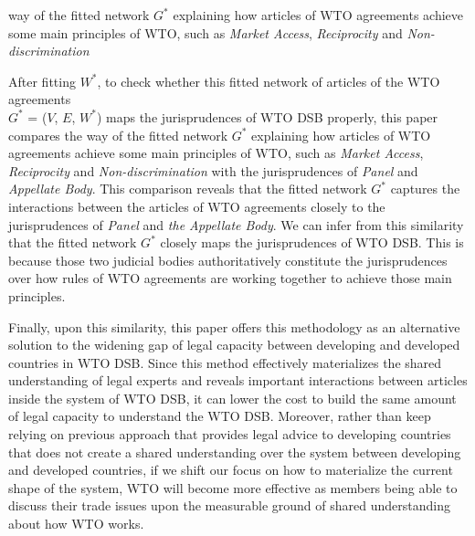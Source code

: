 



way of the fitted network $G^*$ explaining how articles of WTO agreements achieve some main principles of WTO, such as \textit{Market Access}, \textit{Reciprocity} and \textit{Non-discrimination}



 
After fitting $W^*$, to check whether this fitted network of articles of the WTO agreements\\  $G^*$ = ($V$, $E$, $W^*$) maps the jurisprudences of WTO DSB properly, this paper
compares the way of the fitted network $G^*$ explaining how articles of WTO agreements achieve some main principles of WTO, such as \textit{Market Access}, \textit{Reciprocity} and \textit{Non-discrimination}
with the jurisprudences of \textit{Panel} and \textit{Appellate Body}. This comparison reveals that the fitted network $G^*$ captures the interactions between the articles of WTO agreements
closely to the jurisprudences of \textit{Panel} and \textit{the Appellate Body}. We can infer from this similarity that the fitted network $G^*$ closely maps the jurisprudences of WTO DSB. This is because those two judicial bodies
authoritatively constitute the jurisprudences over how rules of WTO agreements are working together
to achieve those main principles.
 
Finally, upon this similarity, this paper offers this methodology as
an alternative solution to the widening gap of legal capacity between developing and developed countries in WTO DSB.
Since this method effectively materializes the shared understanding of legal experts and reveals important interactions between articles inside the system of WTO DSB,
it can lower the cost to build the same amount of legal capacity to understand the WTO DSB.
Moreover, rather than keep relying on previous approach that provides legal advice to developing countries that does not create a shared understanding over the system between developing and developed countries,
if we shift our focus on how to materialize the current shape of the system, WTO
will become more effective as members being able to discuss their trade issues upon the measurable ground of shared understanding about how WTO works.
 



